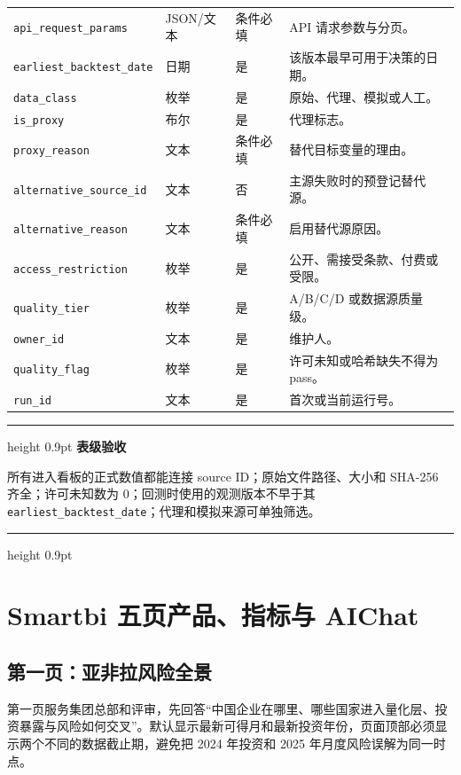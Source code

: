 \documentclass[UTF8,fontset=windows,12pt,openany]{ctexbook}
\newenvironment{gatebox}[1][]{%
  \par\medskip\noindent\begin{center}\begin{minipage}{0.93\textwidth}%
  \color{GoldLine}\hrule height 0.9pt\vspace{0.45em}%
  \textbf{#1}\par\smallskip\color{black}%
}{%
  \par\vspace{0.35em}\color{GoldLine}\hrule height 0.9pt%
  \end{minipage}\end{center}\medskip%
}
\newcommand{\Field}[1]{{\small\nolinkurl{#1}}}
\begin{document}
\begin{longtable}{p{3.7cm}p{2.3cm}p{2.1cm}p{5.1cm}}
\Field{api_request_params} & JSON/文本 & 条件必填 & API 请求参数与分页。\\
\Field{earliest_backtest_date} & 日期 & 是 & 该版本最早可用于决策的日期。\\
\Field{data_class} & 枚举 & 是 & 原始、代理、模拟或人工。\\
\Field{is_proxy} & 布尔 & 是 & 代理标志。\\
\Field{proxy_reason} & 文本 & 条件必填 & 替代目标变量的理由。\\
\Field{alternative_source_id} & 文本 & 否 & 主源失败时的预登记替代源。\\
\Field{alternative_reason} & 文本 & 条件必填 & 启用替代源原因。\\
\Field{access_restriction} & 枚举 & 是 & 公开、需接受条款、付费或受限。\\
\Field{quality_tier} & 枚举 & 是 & A/B/C/D 或数据源质量级。\\
\Field{owner_id} & 文本 & 是 & 维护人。\\
\Field{quality_flag} & 枚举 & 是 & 许可未知或哈希缺失不得为 pass。\\
\Field{run_id} & 文本 & 是 & 首次或当前运行号。\\
\bottomrule
\end{longtable}

\begin{gatebox}[表级验收]
所有进入看板的正式数值都能连接 source ID；原始文件路径、大小和 SHA-256 齐全；许可未知数为 0；回测时使用的观测版本不早于其 \Field{earliest_backtest_date}；代理和模拟来源可单独筛选。
\end{gatebox}

\part{Smartbi 五页产品、指标与 AIChat}

\chapter{第一页：亚非拉风险全景}

第一页服务集团总部和评审，先回答“中国企业在哪里、哪些国家进入量化层、投资暴露与风险如何交叉”。默认显示最新可得月和最新投资年份，页面顶部必须显示两个不同的数据截止期，避免把 2024 年投资和 2025 年月度风险误解为同一时点。
\end{document}

